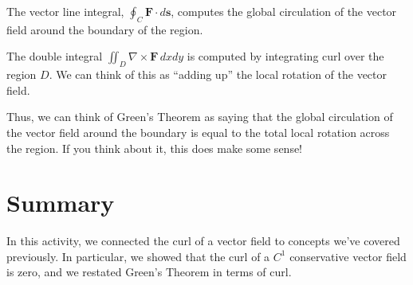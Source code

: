\documentclass{ximera}
\begin{document}
The vector line integral, $\oint_C\mathbf{F}\cdot d\mathbf{s}$, computes the global circulation of the vector field around the boundary of the region.

The double integral $\iint_D\nabla\times\mathbf{F}\,dxdy$ is computed by integrating curl over the region $D$. We can think of this as ``adding up'' the local rotation of the vector field.

Thus, we can think of Green's Theorem as saying that the global circulation of the vector field around the boundary is equal to the total local rotation across the region. If you think about it, this does make some sense!

\section{Summary}

In this activity, we connected the curl of a vector field to concepts we've covered previously. In particular, we showed that the curl of a $C^1$ conservative vector field is zero, and we restated Green's Theorem in terms of curl.
\end{document}

